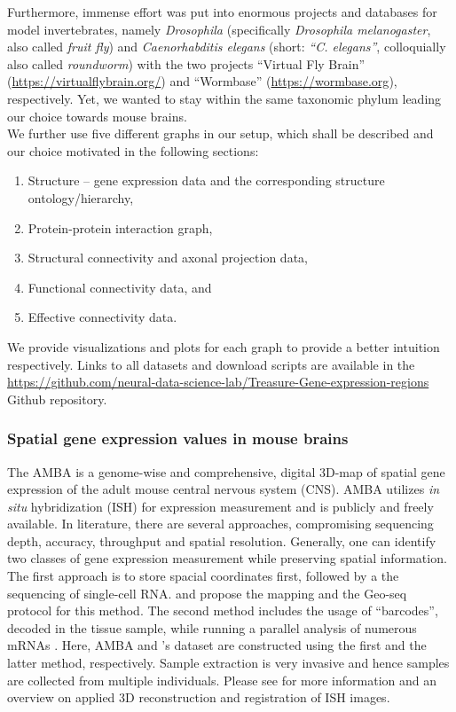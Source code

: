 \documentclass[]{article}
\renewcommand{\cite}{\citep}
\newcommand{\Github}{https://github.com/neural-data-science-lab/Treasure-Gene-expression-regions}
\begin{document}
Furthermore, immense effort was put into enormous projects and databases for model invertebrates, namely \textit{Drosophila} (specifically \textit{Drosophila melanogaster}, also called \textit{fruit fly}) and \textit{Caenorhabditis elegans} (short: \textit{``C. elegans''}, colloquially also called \textit{roundworm}) with the two projects ``Virtual Fly Brain'' \cite{milyaev2012virtual} (\href{https://virtualflybrain.org/}{https://virtualflybrain.org/}) and ``Wormbase'' \cite{lee2003building, davis2022wormbase} (\href{https://wormbase.org}{https://wormbase.org}), respectively. Yet, we wanted to stay within the same taxonomic phylum leading our choice towards mouse brains.\\

We further use five different graphs in our setup, which shall be described and our choice motivated in the following sections:
\begin{enumerate}
	\item Structure -- gene expression data and the corresponding structure ontology/hierarchy, 
	\item Protein-protein interaction graph,
	\item Structural connectivity and axonal projection data, 
	\item Functional connectivity data, and
	\item Effective connectivity data.
\end{enumerate}

We provide visualizations and plots for each graph to provide a better intuition respectively. Links to all datasets and download scripts are available in the \href{\Github}{\Github} Github repository.

\subsubsection{Spatial gene expression values in mouse brains}
\label{sec:geneexp_data}

The AMBA\cite{MouseBrainAtlas} is a genome-wise and comprehensive, digital 3D-map of spatial gene expression of the adult mouse central nervous system (CNS). AMBA utilizes \textit{in situ} hybridization (ISH) for expression measurement and is publicly and freely available. 
In literature, there are several approaches, compromising sequencing depth, accuracy, throughput and spatial resolution. Generally, one can identify two classes of gene expression measurement while preserving spatial information. The first approach is to store spacial coordinates first, followed by a the sequencing of single-cell RNA. \citet{achim2015high} and \citet{chen2017spatial} propose the mapping and the Geo-seq protocol for this method. The second method includes the usage of ``barcodes'', decoded in the tissue sample, while running a parallel analysis of numerous mRNAs \cite{ke2013situ, moffitt2016high}. Here, AMBA and \citet{Partel2020}'s dataset are constructed using the first and the latter method, respectively. Sample extraction is very invasive and hence samples are collected from multiple individuals. Please see \citet{ng2007neuroinformatics} for more information and an overview on applied 3D reconstruction and registration of ISH images.\\
\end{document}
